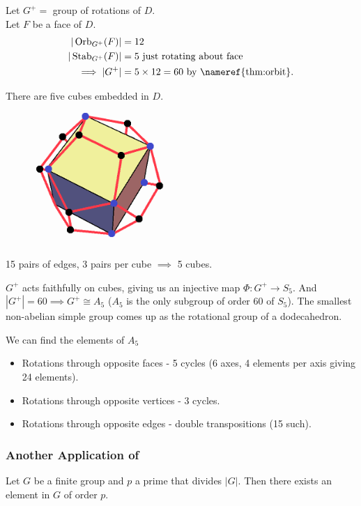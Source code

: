 Let $G^+ =$ group of rotations of $D$. \\
Let $F$ be a face of $D$.
\begin{align*}
    | \operatorname{Orb}_{G^+}(F)| &= 12 \\
    | \operatorname{Stab}_{G^+}(F) | &= 5 \text{ just rotating about face} \\
    \implies |G^+| &= 5 \times 12 = 60 \text{ by \nameref{thm:orbit}.}
\end{align*} 

There are five cubes embedded in $D$.

\begin{figure}
    \centering
    \includegraphics[height=5cm]{figures/07-cube-dodecahedron}
\end{figure} 

15 pairs of edges, 3 pairs per cube $\implies$ 5 cubes.

$G^+$ acts faithfully on cubes, giving us an injective map $\Phi : G^+ \to S_5$.
And $|G^+| = 60 \implies G^+ \cong A_5$ ($A_5$ is the only subgroup of order 60 of $S_5$).
The smallest non-abelian simple group comes up as the rotational group of a dodecahedron.

We can find the elements of $A_5$
\begin{itemize}
    \item Rotations through opposite faces - 5 cycles (6 axes, 4 elements per axis giving 24 elements).
    \item Rotations through opposite vertices - 3 cycles.
    \item Rotations through opposite edges - double transpositions (15 such).
\end{itemize} 

\subsubsection{Another Application of }

\begin{theorem} \label{thm:8}
    Let $G$ be a finite group and $p$ a prime that divides $|G|$.
    Then there exists an element in $G$ of order $p$.
\end{theorem} 

